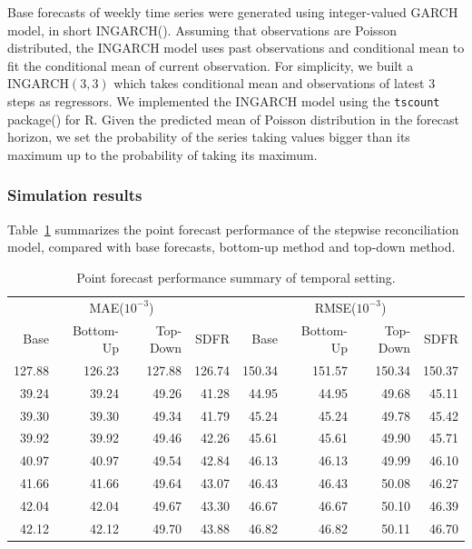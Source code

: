 \documentclass[a4paper,review,12pt,authoryear]{elsarticle}
\let\code=\texttt
\let\proglang=\textsf
\begin{document}
Base forecasts of weekly time series were generated using integer-valued GARCH model, in short $\textrm{INGARCH}$(). 
Assuming that observations are Poisson distributed, the $\textrm{INGARCH}$ model uses past observations and conditional mean to fit the conditional mean of current observation.
For simplicity, we built a $\textrm{INGARCH}(3, 3)$ which takes conditional mean and observations of latest $3$ steps as regressors. 
We implemented the $\textrm{INGARCH}$ model using the \code{tscount} package() for \proglang{R}.
Given the predicted mean of Poisson distribution in the forecast horizon, we set the probability of the series taking values bigger than its maximum up to the probability of taking its maximum.

\subsubsection{Simulation results}

Table~\ref{tab:sim_temporal_res_point} summarizes the point forecast performance of the stepwise reconciliation model, compared with base forecasts, bottom-up method and top-down method.

\begin{table}[h]
\centering
\caption{\label{tab:sim_temporal_res_point} Point forecast performance summary of temporal setting.}
\begin{tabular}{rrrrrrrr}
\toprule
\multicolumn{4}{c}{MAE($10^{-3}$)}  & 
\multicolumn{4}{c}{RMSE($10^{-3}$)}\\ 
Base & Bottom-Up & Top-Down & SDFR & 
Base & Bottom-Up & Top-Down & SDFR \\
\cmidrule(lr){1-4} \cmidrule(lr){5-8}
127.88 & 126.23 & 127.88 & 126.74 & 150.34 & 151.57 & 150.34 & 150.37\\
 39.24 &  39.24 &  49.26 &  41.28 & 44.95 & 44.95 & 49.68 & 45.11\\
 39.30 &  39.30 &  49.34 &  41.79 & 45.24 & 45.24 & 49.78 & 45.42\\
 39.92 &  39.92 &  49.46 &  42.26 & 45.61 & 45.61 & 49.90 & 45.71\\
 40.97 &  40.97 &  49.54 &  42.84 & 46.13 & 46.13 & 49.99 & 46.10\\
 41.66 &  41.66 &  49.64 &  43.07 & 46.43 & 46.43 & 50.08 & 46.27\\
 42.04 &  42.04 &  49.67 &  43.30 & 46.67 & 46.67 & 50.10 & 46.39\\
 42.12 &  42.12 &  49.70 &  43.88 & 46.82 & 46.82 & 50.11 & 46.70\\
\bottomrule
\end{tabular}
\end{table}
\end{document}
